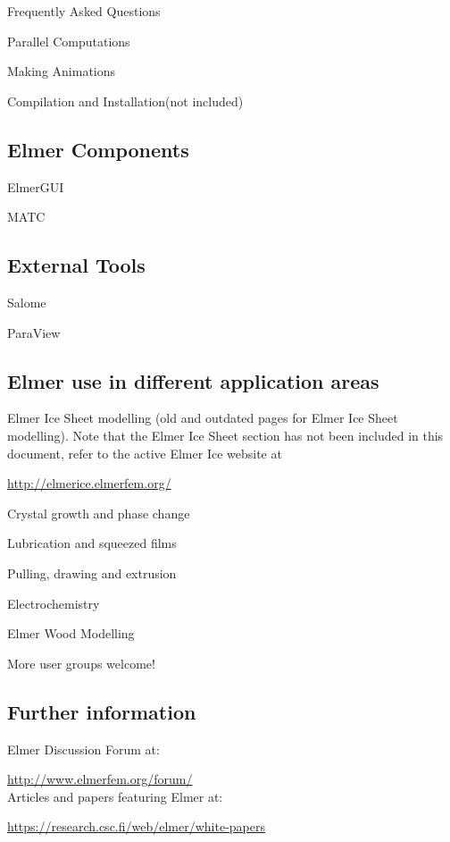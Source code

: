 \noindent Frequently Asked Questions

\noindent Parallel Computations

\noindent Making Animations

\noindent Compilation and Installation(not included)

\subsection{Elmer Components}

\noindent ElmerGUI

\noindent MATC

\subsection{External Tools}

\noindent Salome

\noindent ParaView

\subsection{Elmer use in different application areas}

\noindent Elmer Ice Sheet modelling (old and outdated pages for Elmer Ice Sheet modelling).  Note that the Elmer Ice Sheet section has not been included in this document, refer to the active Elmer Ice website at

\url{http://elmerice.elmerfem.org/}

\noindent Crystal growth and phase change

\noindent Lubrication and squeezed films

\noindent Pulling, drawing and extrusion

\noindent Electrochemistry

\noindent Elmer Wood Modelling

\noindent More user groups welcome!

\subsection{Further information}

\noindent Elmer Discussion Forum at:

\url{http://www.elmerfem.org/forum/}\\

\noindent Articles and papers featuring Elmer at:

\url{https://research.csc.fi/web/elmer/white-papers}\\

